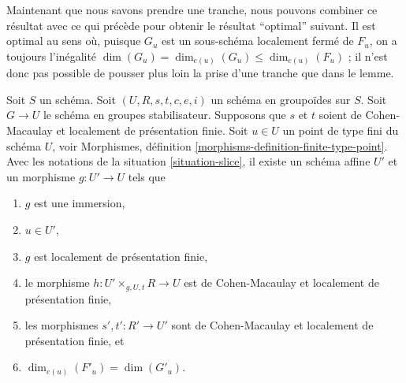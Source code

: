 \noindent
Maintenant que nous savons prendre une tranche, nous pouvons combiner ce résultat avec ce qui précède
pour obtenir le résultat ``optimal'' suivant. Il est optimal au sens où,
puisque $G_u$ est un sous-schéma localement fermé de $F_u$, on a toujours
l'inégalité $\dim(G_u) = \dim_{e(u)}(G_u) \leq \dim_{e(u)}(F_u)$ ; il
n'est donc pas possible de pousser plus loin la prise d'une tranche que dans le lemme.

\begin{lemma}
\label{lemma-max-slice}
Soit $S$ un schéma.
Soit $(U, R, s, t, c, e, i)$ un schéma en groupoïdes sur $S$.
Soit $G \to U$ le schéma en groupes stabilisateur.
Supposons que $s$ et $t$ soient de Cohen-Macaulay et localement de présentation finie.
Soit $u \in U$ un point de type fini du schéma $U$, voir
Morphismes, définition \ref{morphisms-definition-finite-type-point}.
Avec les notations de la
situation \ref{situation-slice},
il existe un schéma affine $U'$ et un morphisme $g : U' \to U$ tels que
\begin{enumerate}
\item $g$ est une immersion,
\item $u \in U'$,
\item $g$ est localement de présentation finie,
\item le morphisme $h : U' \times_{g, U, t} R \longrightarrow U$
est de Cohen-Macaulay et localement de présentation finie,
\item les morphismes $s', t' : R' \to U'$ sont de Cohen-Macaulay et
localement de présentation finie, et
\item $\dim_{e(u)}(F'_u) = \dim(G'_u)$.
\end{enumerate}
\end{lemma}

